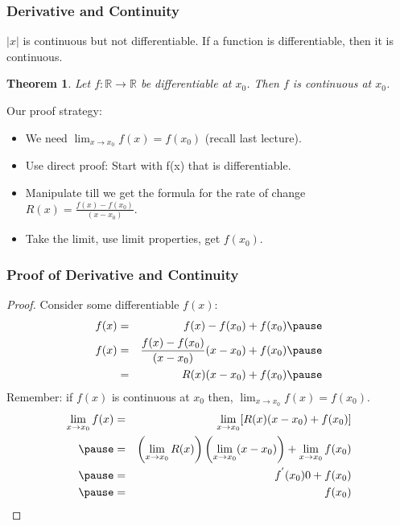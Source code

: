 \documentclass{beamer}
\newtheorem{thm}{Theorem}
\numberwithin{equation}{section}
\begin{document}
\begin{frame}
\frametitle{Derivative and Continuity}

$|x|$ is continuous but not differentiable. If a function is differentiable, then it is continuous.\pause

\begin{thm} Let $f:\mathbb{R} \rightarrow \mathbb{R}$ be differentiable at $x_{0}$.  Then $f$ is continuous at $x_{0}$.
\end{thm}
\pause
Our proof strategy: 
\begin{itemize}
\item We need $\lim_{x\rightarrow x_{0}} f(x) = f(x_{0})$ (recall last lecture).
\item Use direct proof: Start with f(x) that is differentiable.
\item Manipulate till we get the formula for the rate of change $R(x) =\frac{ f(x) - f(x_{0})}{(x- x_{0})}$. 
\item Take the limit, use limit properties, get $f(x_{0}).$
\end{itemize}
 \end{frame}



\begin{frame}
\frametitle{Proof of Derivative and Continuity}
\begin{proof}
Consider some differentiable $f(x)$: \pause 
\begin{eqnarray}
f(x) & =& f(x) -f(x_{0} )+f(x_{0}) \nonumber  \pause  \\
f(x) & = & \frac{ f(x) - f(x_{0})}{(x- x_{0})} (x - x_{0} ) + f(x_{0} )\nonumber  \pause  \\
& = & R(x) (x - x_{0} ) + f(x_{0} ) \nonumber \pause 
	\end{eqnarray}
Remember: if $f(x)$ is continuous at $x_{0}$ then, $\lim_{x\rightarrow x_{0}} f(x) = f(x_{0})$.  \pause 
\begin{eqnarray}
\lim_{x\rightarrow x_{0}} f(x) & = & \lim_{x\rightarrow x_{0} } [R(x) (x - x_{0} ) + f(x_{0}) ] \nonumber \\ \pause 
& = & \left(\lim_{x\rightarrow x_{0} } R(x) \right)\left(\lim_{x\rightarrow x_{0}} (x - x_{0}) \right)  + \lim_{x\rightarrow x_{0}} f(x_{0} ) \nonumber \\ \pause 
& = & f^{'}(x_{0} ) 0 + f(x_{0})  \nonumber \\\pause
& = &f(x_{0} ) \nonumber
	\end{eqnarray}

\end{proof}

\end{frame}
\end{document}
